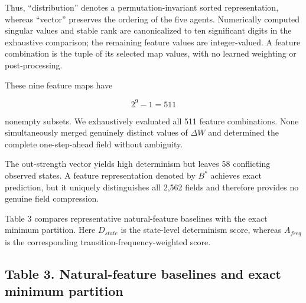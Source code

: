 \documentclass[
  11pt,
]{article}
\begin{document}
Thus, ``distribution'' denotes a permutation-invariant sorted
representation, whereas ``vector'' preserves the ordering of the five
agents. Numerically computed singular values and stable rank are
canonicalized to ten significant digits in the exhaustive comparison;
the remaining feature values are integer-valued. A feature combination
is the tuple of its selected map values, with no learned weighting or
post-processing.

These nine feature maps have

\[{2^9-1=511}\]

nonempty subsets. We exhaustively evaluated all 511 feature
combinations. None simultaneously merged genuinely distinct values of
\({\Delta W}\) and determined the complete one-step-ahead field without
ambiguity.

The out-strength vector yields high determinism but leaves 58
conflicting observed states. A feature representation denoted by
\({B^\ast}\) achieves exact prediction, but it uniquely distinguishes
all 2,562 fields and therefore provides no genuine field compression.

Table 3 compares representative natural-feature baselines with the exact
minimum partition. Here \({D_{state}}\) is the state-level determinism
score, whereas \({A_{freq}}\) is the corresponding
transition-frequency-weighted score.

\hypertarget{table-3.-natural-feature-baselines-and-exact-minimum-partition}{%
\subsection{Table 3. Natural-feature baselines and exact minimum
partition}\label{table-3.-natural-feature-baselines-and-exact-minimum-partition}}
\end{document}
